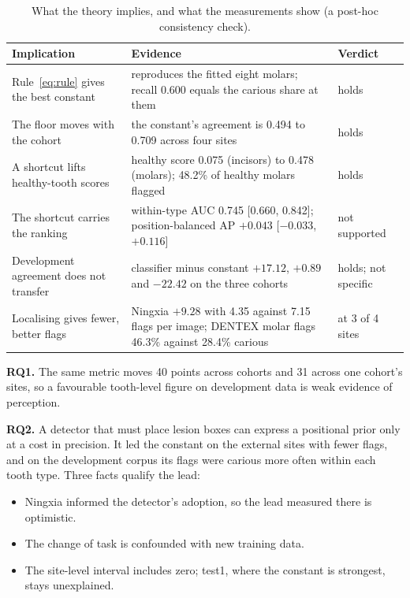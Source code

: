 \begin{table}[!htbp]
\centering
\caption[What the theory implies, and what the measurements show]{What the theory implies, and what the
measurements show (a post-hoc consistency check).}
\label{tab:theory}
\small
\begin{tabularx}{\textwidth}{@{}L{4.2cm}YL{2.4cm}@{}}
\toprule
Implication & Evidence & Verdict\\
\midrule
Rule~\eqref{eq:rule} gives the best constant & reproduces the fitted eight molars; recall 0.600 equals the carious share at them & holds\\
The floor moves with the cohort & the constant's agreement is 0.494 to 0.709 across four sites & holds\\
A shortcut lifts healthy-tooth scores & healthy score 0.075 (incisors) to 0.478 (molars); 48.2\% of healthy molars flagged & holds\\
The shortcut carries the ranking & within-type AUC 0.745 [0.660, 0.842]; position-balanced AP $+0.043$ [$-0.033$, $+0.116$] & not supported\\
Development agreement does not transfer & classifier minus constant $+17.12$, $+0.89$ and $-22.42$ on the three cohorts & holds; not specific\\
Localising gives fewer, better flags & Ningxia $+9.28$ with 4.35 against 7.15 flags per image; DENTEX molar flags 46.3\% against 28.4\% carious & at 3 of 4 sites\\
\bottomrule
\end{tabularx}
\end{table}

\textbf{RQ1.} The same metric moves 40 points across cohorts and 31 across one cohort's sites, so a
favourable tooth-level figure on development data is weak evidence of perception.

\textbf{RQ2.} A detector that must place lesion boxes can express a positional prior only at a cost in
precision. It led the constant on the external sites with fewer flags, and on the development corpus its
flags were carious more often within each tooth type. Three facts qualify the lead:
\begin{itemize}
\item Ningxia informed the detector's adoption, so the lead measured there is optimistic.
\item The change of task is confounded with new training data.
\item The site-level interval includes zero; test1, where the constant is strongest, stays unexplained.
\end{itemize}

